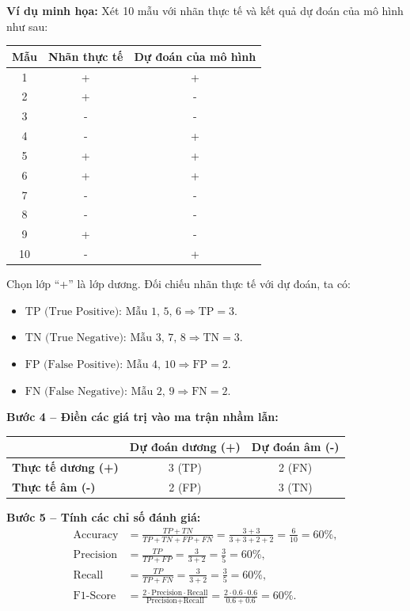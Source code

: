 \textbf{Ví dụ minh họa:} Xét 10 mẫu với nhãn thực tế và kết quả dự đoán của mô hình như sau:
\begin{table}[H]
    \centering
    \begin{tabular}{|c|c|c|}
        \hline
        \textbf{Mẫu} & \textbf{Nhãn thực tế} & \textbf{Dự đoán của mô hình} \\
        \hline
        1 & + & + \\ \hline
        2 & + & - \\ \hline
        3 & - & - \\ \hline
        4 & - & + \\ \hline
        5 & + & + \\ \hline
        6 & + & + \\ \hline
        7 & - & - \\ \hline
        8 & - & - \\ \hline
        9 & + & - \\ \hline
        10 & - & + \\ \hline
    \end{tabular}
\end{table}

Chọn lớp ``+'' là lớp dương. Đối chiếu nhãn thực tế với dự đoán, ta có:
\begin{itemize}
    \item $\text{TP (True Positive): Mẫu 1, 5, 6} \Rightarrow \text{TP} = 3$.
    \item $\text{TN (True Negative): Mẫu 3, 7, 8} \Rightarrow \text{TN} = 3$.
    \item $\text{FP (False Positive): Mẫu 4, 10} \Rightarrow \text{FP} = 2$.
    \item $\text{FN (False Negative): Mẫu 2, 9} \Rightarrow \text{FN} = 2$.
\end{itemize}

\textbf{Bước 4 -- Điền các giá trị vào ma trận nhầm lẫn:}
\begin{table}[H]
    \centering
    \renewcommand{\arraystretch}{1.3}
    \begin{tabular}{|l|c|c|}
        \hline
        & \textbf{Dự đoán dương (+)} & \textbf{Dự đoán âm (-)} \\
        \hline
        \textbf{Thực tế dương (+)} & 3 (TP) & 2 (FN) \\
        \hline
        \textbf{Thực tế âm (-)} & 2 (FP) & 3 (TN) \\
        \hline
    \end{tabular}
\end{table}

\textbf{Bước 5 -- Tính các chỉ số đánh giá:}
\begin{align*}
\text{Accuracy}
&= \frac{TP+TN}{TP+TN+FP+FN}
= \frac{3+3}{3+3+2+2}
= \frac{6}{10}
= 60\%,\\
\text{Precision}
&= \frac{TP}{TP+FP}
= \frac{3}{3+2}
= \frac{3}{5}
= 60\%,\\
\text{Recall}
&= \frac{TP}{TP+FN}
= \frac{3}{3+2}
= \frac{3}{5}
= 60\%,\\
\text{F1-Score}
&= \frac{2 \cdot \text{Precision} \cdot \text{Recall}}
{\text{Precision}+\text{Recall}}
= \frac{2 \cdot 0.6 \cdot 0.6}{0.6+0.6}
= 60\%.
\end{align*}
